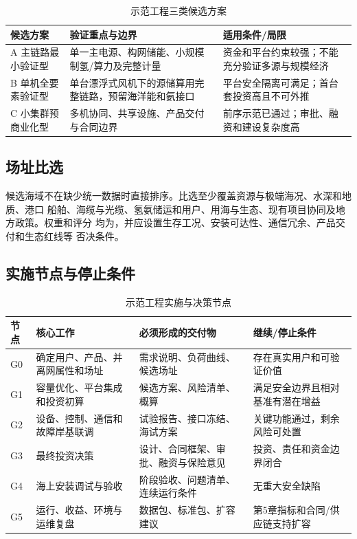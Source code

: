 \begin{table}[H]
\centering
\caption{示范工程三类候选方案}
\label{tab:c6-demo-options}
\begin{tabularx}{\textwidth}{p{2.5cm} X X}
\toprule
候选方案 & 验证重点与边界 & 适用条件/局限\\
\midrule
A 主链路最小验证型 & 单一主电源、构网储能、小规模制氢/算力及完整计量 & 资金和平台约束较强；不能充分验证多源与规模经济\\
B 单机全要素验证型 & 单台漂浮式风机下的源储算用完整链路，预留海洋能和氨接口 & 平台安全隔离可满足；首台套投资高且不可外推\\
C 小集群预商业化型 & 多机协同、共享设施、产品交付与合同边界 & 前序示范已通过；审批、融资和建设复杂度高\\
\bottomrule
\end{tabularx}
\end{table}

\subsection{场址比选}

候选海域不在缺少统一数据时直接排序。比选至少覆盖资源与极端海况、水深和地质、港口
船舶、海缆与光缆、氢氨储运和用户、用海与生态、现有项目协同及地方政策。权重和评分
均为\assumptiontag，并应设置生存工况、安装可达性、通信冗余、产品交付和生态红线等
否决条件。

\subsection{实施节点与停止条件}

\begin{table}[H]
\centering
\caption{示范工程实施与决策节点}
\label{tab:c6-demo-gates}
\footnotesize
\begin{tabularx}{\textwidth}{p{1.6cm} p{3cm} X X}
\toprule
节点 & 核心工作 & 必须形成的交付物 & 继续/停止条件\\
\midrule
G0 & 确定用户、产品、并离网属性和场址 & 需求说明、负荷曲线、候选场址 & 存在真实用户和可验证价值\\
G1 & 容量优化、平台集成和投资初算 & 候选方案、风险清单、概算 & 满足安全边界且相对基准有潜在增益\\
G2 & 设备、控制、通信和故障岸基联调 & 试验报告、接口冻结、海试方案 & 关键功能通过，剩余风险可处置\\
G3 & 最终投资决策 & 设计、合同框架、审批、融资与保险意见 & 投资、责任和资金边界闭合\\
G4 & 海上安装调试与验收 & 阶段验收、问题清单、连续运行条件 & 无重大安全缺陷\\
G5 & 运行、收益、环境与运维复盘 & 数据包、标准包、扩容建议 & 第5章指标和合同/供应链支持扩容\\
\bottomrule
\end{tabularx}
\end{table}

